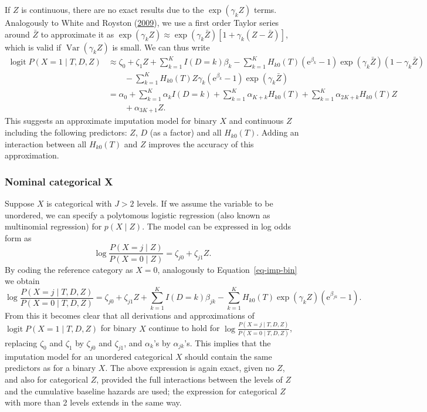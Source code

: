 \documentclass[
  letterpaper,
  DIV=11,
  numbers=noendperiod]{scrreprt}
\DeclareMathOperator{\logit}{logit}
\DeclareMathOperator{\Var}{Var}
\begin{document}
If \(Z\) is continuous, there are no exact results due to the
\(\exp(\gamma_k Z)\) terms. Analogously to White and Royston
(\protect\hyperlink{ref-whiteImputingMissingCovariate2009}{2009}), we
use a first order Taylor series around \(\bar{Z}\) to approximate it as
\(\exp(\gamma_k Z) \approx \exp(\gamma_k \bar{Z}) [ 1 + \gamma_k(Z - \bar{Z}) ]\),
which is valid if \(\Var(\gamma_k Z)\) is small. We can thus write
\begin{align*}
    \logit P(X = 1 \mid T, D, Z) &\approx \zeta_0 + \zeta_1 Z + \sum^K_{k = 1} I(D=k) \beta_k \nonumber - \sum^K_{k = 1} H_{k0}(T)(\mathrm{e}^{\beta_k}  - 1)\exp(\gamma_k \bar{Z})(1 - \gamma_k \bar{Z}) \nonumber \\
    &\qquad - \sum^K_{k = 1} H_{k0}(T) Z \gamma_k (\mathrm{e}^{\beta_k}  - 1)\exp(\gamma_k \bar{Z}) \nonumber \\
    &= \alpha_0  + \sum^K_{k = 1} \alpha_{k} I(D=k) + \sum^K_{k = 1} \alpha_{K + k} H_{k0}(T) + \sum^K_{k = 1} \alpha_{2K + k} H_{k0}(T) Z \nonumber \\
    &\qquad + \alpha_{3K + 1} Z.
\end{align*} This suggests an approximate imputation model for binary
\(X\) and continuous \(Z\) including the following predictors: \(Z\),
\(D\) (as a factor) and all \(H_{k0}(T)\). Adding an interaction between
all \(H_{k0}(T)\) and \(Z\) improves the accuracy of this approximation.

\hypertarget{nominal-categorical-x-1}{%
\subsubsection{Nominal categorical X}\label{nominal-categorical-x-1}}

Suppose \(X\) is categorical with \(J>2\) levels. If we assume the
variable to be unordered, we can specify a polytomous logistic
regression (also known as multinomial regression) for \(p(X \mid Z)\).
The model can be expressed in log odds form as \begin{equation*}
    \log \frac{P(X = j \mid Z)}{P(X = 0\mid Z)}  = \zeta_{j0} + \zeta_{j1} Z.
\end{equation*} By coding the reference category as \(X=0\), analogously
to Equation~\ref{eq-imp-bin} we obtain \begin{equation*}
    \log \frac{P(X = j \mid T,D,Z)}{P(X = 0\mid T,D,Z)} = \zeta_{j0} + \zeta_{j1} Z + \sum^K_{k = 1} I(D=k) \beta_{jk} - \sum^K_{k = 1} H_{k0}(T)\exp(\gamma_k Z)(\mathrm{e}^{\beta_{jk}}  - 1).
\end{equation*} From this it becomes clear that all derivations and
approximations of \(\logit P(X = 1 \mid T, D, Z)\) for binary \(X\)
continue to hold for
\(\log \frac{P(X = j \mid T,D,Z)}{P(X = 0\mid T,D,Z)}\), replacing
\(\zeta_0\) and \(\zeta_1\) by \(\zeta_{j0}\) and \(\zeta_{j1}\), and
\(\alpha_k\)'s by \(\alpha_{jk}\)'s. This implies that the imputation
model for an unordered categorical \(X\) should contain the same
predictors as for a binary \(X\). The above expression is again exact,
given no \(Z\), and also for categorical \(Z\), provided the full
interactions between the levels of \(Z\) and the cumulative baseline
hazards are used; the expression for categorical \(Z\) with more than 2
levels extends in the same way.
\end{document}
